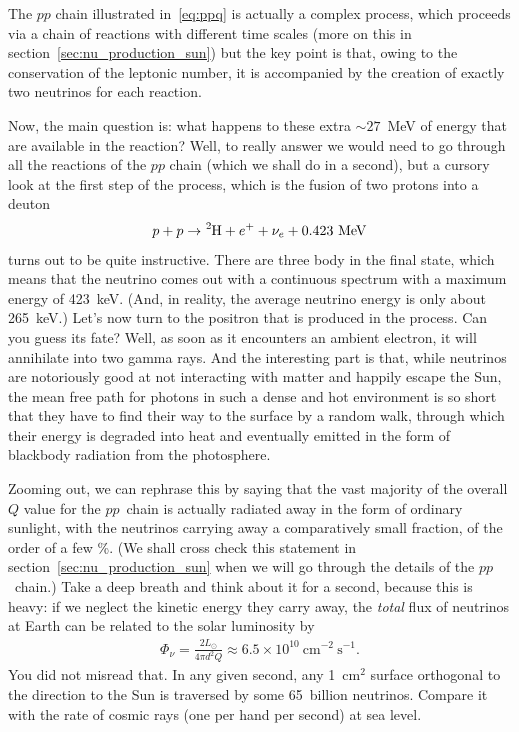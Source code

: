 The $pp$ chain illustrated in~\eqref{eq:ppq} is actually a complex process,
which proceeds via a chain of reactions with different time scales
(more on this in section~\ref{sec:nu_production_sun}) but the key point is that,
owing to the conservation of the leptonic number, it is accompanied by the creation
of exactly two neutrinos for each reaction.

Now, the main question is: what happens to these extra $\sim 27$~MeV of energy that
are available in the reaction? Well, to really answer we would need to go through
all the reactions of the $pp$ chain (which we shall do in a second), but a cursory
look at the first step of the process, which is the fusion of two protons into a
deuton
\begin{align}\label{eq:deuton_fusion}
  p + p \rightarrow \ce{^2H} + e^+ + \nu_e +  0.423~\text{MeV}
\end{align}
turns out to be quite instructive. There are three body in the final state, which
means that the neutrino comes out with a continuous spectrum with a maximum
energy of 423~keV. (And, in reality, the average neutrino energy is only about
265~keV.) Let's now turn to the positron that is produced in the process. Can
you guess its fate? Well, as soon as it encounters an ambient electron, it will
annihilate into two gamma rays. And the interesting part is that, while neutrinos
are notoriously good at not interacting with matter and happily escape the Sun,
the mean free path for photons in such a dense and hot environment is so short
that they have to find their way to the surface by a random walk, through which
their energy is degraded into heat and eventually emitted in the form of blackbody
radiation from the photosphere.

Zooming out, we can rephrase this by saying that the vast majority of the
overall $Q$ value for the $pp$~chain is actually radiated away in the form of
ordinary sunlight, with the neutrinos carrying away a comparatively small fraction,
of the order of a few \%.
(We shall cross check this statement in section~\ref{sec:nu_production_sun} when
we will go through the details of the $pp$~chain.) Take a deep breath and think
about it for a second, because this is heavy: if we neglect the kinetic energy
they carry away, the \emph{total} flux of neutrinos
at Earth can be related to the solar luminosity by
\begin{align}
  \Phi_\nu = \frac{2 L_\odot}{4\pi d^2 Q} \approx
  6.5 \times 10^{10}~\text{cm}^{-2}~\text{s}^{-1}.
\end{align}
You did not misread that. In any given second, any 1~cm$^2$ surface orthogonal to
the direction to the Sun is traversed by some 65~billion neutrinos. Compare it
with the rate of cosmic rays (one per hand per second) at sea level.


